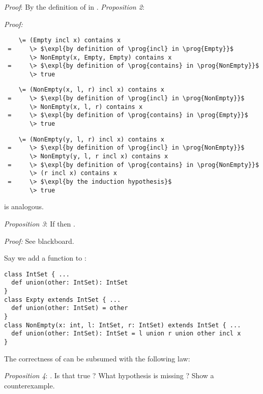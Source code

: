 \documentclass[a4paper,12pt,twoside,titlepage]{book}
\begin{document}
{\emph{Proof}: By the definition of  in .
\es\bs
\emph{Proposition 2}: 

\emph{Proof:}

\begin{lstlisting}
    \= (Empty incl x) contains x
 =     \> $\expl{by definition of \prog{incl} in \prog{Empty}}$
       \> NonEmpty(x, Empty, Empty) contains x
 =     \> $\expl{by definition of \prog{contains} in \prog{NonEmpty}}$
       \> true
\end{lstlisting}

\begin{lstlisting}
    \= (NonEmpty(x, l, r) incl x) contains x
 =     \> $\expl{by definition of \prog{incl} in \prog{NonEmpty}}$
       \> NonEmpty(x, l, r) contains x
 =     \> $\expl{by definition of \prog{contains} in \prog{Empty}}$
       \> true
\end{lstlisting}
\es\bs
{}
\begin{lstlisting}
    \= (NonEmpty(y, l, r) incl x) contains x
 =     \> $\expl{by definition of \prog{incl} in \prog{NonEmpty}}$
       \> NonEmpty(y, l, r incl x) contains x
 =     \> $\expl{by definition of \prog{contains} in \prog{NonEmpty}}$
       \> (r incl x) contains x
 =     \> $\expl{by the induction hypothesis}$
       \> true
\end{lstlisting}

 is analogous.

\bigskip

\emph{Proposition 3}: If  then
.

\emph{Proof:} See blackboard.
\es
{}

Say we add a  function to :

\begin{lstlisting}
class IntSet { ...
  def union(other: IntSet): IntSet
}
class Expty extends IntSet { ...
  def union(other: IntSet) = other
}
class NonEmpty(x: int, l: IntSet, r: IntSet) extends IntSet { ...
  def union(other: IntSet): IntSet = l union r union other incl x
}
\end{lstlisting}

The correctness of  can be subsumed with the following
law:

\emph{Proposition 4}: 
.
Is that true ? What hypothesis is missing ? Show a counterexample.

}
\end{document}
